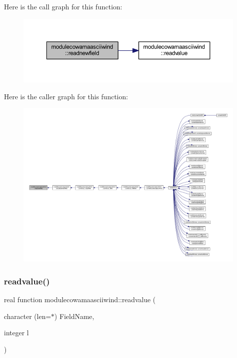 Here is the call graph for this function\+:\nopagebreak
\begin{figure}[H]
\begin{center}
\leavevmode
\includegraphics[width=350pt]{namespacemodulecowamaasciiwind_a34be2c2a2675d82ce063773657b99a0a_cgraph}
\end{center}
\end{figure}
Here is the caller graph for this function\+:\nopagebreak
\begin{figure}[H]
\begin{center}
\leavevmode
\includegraphics[width=350pt]{namespacemodulecowamaasciiwind_a34be2c2a2675d82ce063773657b99a0a_icgraph}
\end{center}
\end{figure}
\mbox{\label{namespacemodulecowamaasciiwind_a3e1412f70915d204c75940a89c18a417}} 
\subsubsection{\texorpdfstring{readvalue()}{readvalue()}}
{\footnotesize\ttfamily real function modulecowamaasciiwind\+::readvalue (\begin{DoxyParamCaption}\item[{character (len=$\ast$)}]{Field\+Name,  }\item[{integer}]{l }\end{DoxyParamCaption})\hspace{0.3cm}{\ttfamily [private]}}

